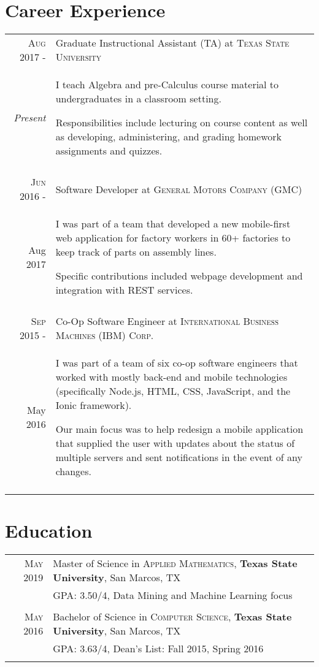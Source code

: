 \documentclass[a4paper,10pt]{article}
\begin{document}
\section{Career Experience}
\begin{tabular}{r|p{12cm}}
\textsc{Aug 2017 -} & Graduate Instructional Assistant (TA) at \textsc{Texas State University} \\
\emph{Present} & \footnotesize{I teach Algebra and pre-Calculus course material to undergraduates in a classroom setting.
 
 	Responsibilities include lecturing on course content as well as developing, administering, and grading homework assignments and quizzes.} \\
 \multicolumn{2}{c}{} \\
 
 \textsc{Jun 2016 -} & Software Developer at \textsc{General Motors Company (GMC)} \\
Aug 2017 & \footnotesize{I was part of a team that developed a new mobile-first web application for factory workers in 60+ factories to keep track of parts on assembly lines.

Specific contributions included webpage development and integration with REST services.
} \\
 \multicolumn{2}{c}{} \\
 
 \textsc{Sep 2015 -} & Co-Op Software Engineer at \textsc{International Business Machines (IBM) Corp.} \\
 May 2016 & \footnotesize{I was part of a team of six co-op software engineers that worked with mostly back-end and mobile technologies (specifically Node.js, HTML, CSS, JavaScript, and the Ionic framework).

Our main focus was to help redesign a mobile application that supplied the user with updates about the status of multiple servers and sent notifications in the event of any changes.} \\
 \multicolumn{2}{c}{} \\
\end{tabular}

\section{Education}
\begin{tabular}{rl}	
 \textsc{May} 2019 & Master of Science in \textsc{Applied Mathematics}, \textbf{Texas State University}, San Marcos, TX\\
 
&\normalsize \textsc{GPA}: 3.50/4, Data Mining and Machine Learning focus \\ & \\

\textsc{May} 2016 & Bachelor of Science in \textsc{Computer Science}, \textbf{Texas State University}, San Marcos, TX \\

&\normalsize \textsc{GPA}: 3.63/4, Dean’s List: Fall 2015, Spring 2016 \\&\\
\end{tabular}
\end{document}
